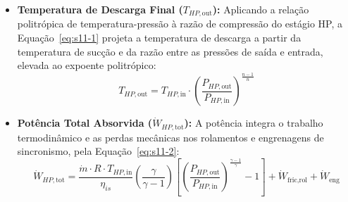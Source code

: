 \documentclass[12pt,a4paper]{article}
\numberwithin{equation}{section}
\numberwithin{table}{section}
\numberwithin{figure}{section}
\begin{document}
	\begin{itemize}
		\item \textbf{Temperatura de Descarga Final ($T_{HP,\text{out}}$):} Aplicando a relação politrópica de temperatura-pressão à razão de compressão do estágio HP, a Equação~\eqref{eq:s11-1} projeta a temperatura de descarga a partir da temperatura de sucção e da razão entre as pressões de saída e entrada, elevada ao expoente politrópico:
		\begin{equation}\label{eq:s11-1}
 T_{HP,\text{out}} = T_{HP,\text{in}} \cdot \left( \frac{P_{HP,\text{out}}}{P_{HP,\text{in}}} \right)^{\frac{n-1}{n}}
\end{equation}
		
		\item \textbf{Potência Total Absorvida ($\dot{W}_{HP,\text{tot}}$):}
		A potência integra o trabalho termodinâmico e as perdas mecânicas nos rolamentos e engrenagens de sincronismo, pela Equação~\eqref{eq:s11-2}:
		\begin{equation}\label{eq:s11-2}
 \dot{W}_{HP,\text{tot}} = \frac{\dot{m} \cdot R \cdot T_{HP,\text{in}}}{\eta_{is}} \left( \frac{\gamma}{\gamma-1} \right) \left[ \left( \frac{P_{HP,\text{out}}}{P_{HP,\text{in}}} \right)^{\frac{\gamma-1}{\gamma}} - 1 \right] + \dot{W}_{\text{fric,rol}} + \dot{W}_{\text{eng}} 
\end{equation}
		

\end{itemize}
\end{document}
